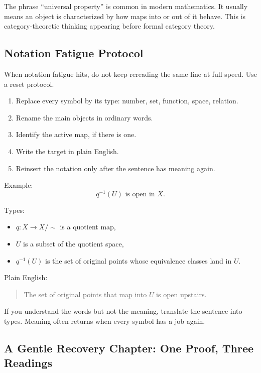 \begin{marginnotebox}
The phrase ``universal property'' is common in modern mathematics. It usually
means an object is characterized by how maps into or out of it behave. This is
category-theoretic thinking appearing before formal category theory.
\end{marginnotebox}

\subsection{Notation Fatigue Protocol}

When notation fatigue hits, do not keep rereading the same line at full speed.
Use a reset protocol.

\begin{enumerate}
\item Replace every symbol by its type: number, set, function, space, relation.
\item Rename the main objects in ordinary words.
\item Identify the active map, if there is one.
\item Write the target in plain English.
\item Reinsert the notation only after the sentence has meaning again.
\end{enumerate}

Example:
\[
q^{-1}(U)\text{ is open in }X.
\]

Types:

\begin{itemize}
\item $q:X\to X/{\sim}$ is a quotient map,
\item $U$ is a subset of the quotient space,
\item $q^{-1}(U)$ is the set of original points whose equivalence classes land in $U$.
\end{itemize}

Plain English:

\begin{quote}
The set of original points that map into $U$ is open upstairs.
\end{quote}

\begin{recoverybox}
If you understand the words but not the meaning, translate the sentence into
types. Meaning often returns when every symbol has a job again.
\end{recoverybox}

\subsection{A Gentle Recovery Chapter: One Proof, Three Readings}

